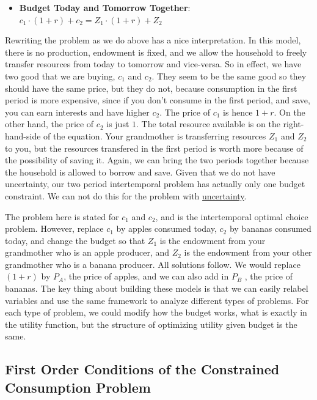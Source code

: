 \documentclass[
]{book}
\providecommand{\tightlist}{%
  \setlength{\itemsep}{0pt}\setlength{\parskip}{0pt}}
\begin{document}
\begin{itemize}
\tightlist
\item
  \textbf{Budget Today and Tomorrow Together}:
  \(c_1 \cdot (1+r)+c_2 =Z_1 \cdot (1+r)+Z_2\)
\end{itemize}

Rewriting the problem as we do above has a nice interpretation. In this
model, there is no production, endowment is fixed, and we allow the
household to freely transfer resources from today to tomorrow and
vice-versa. So in effect, we have two good that we are buying, \(c_1\) and
\(c_2\). They seem to be the same good so they should have the same price,
but they do not, because consumption in the first period is more
expensive, since if you don't consume in the first period, and save, you
can earn interests and have higher \(c_2\). The price of \(c_1\) is hence
\(1+r\). On the other hand, the price of \(c_2\) is just \(1\). The total
resource available is on the right-hand-side of the equation. Your
grandmother is transferring resources \(Z_1\) and \(Z_2\) to you, but the
resources transfered in the first period is worth more because of the
possibility of saving it. Again, we can bring the two periods together
because the household is allowed to borrow and save. Given that we do
not have uncertainty, our two period intertemporal problem has actually
only one budget constraint. We can not do this for the problem with
\href{https://math4econ.github.io/nonlinear/RiskyAsset.html}{uncertainty}.

The problem here is stated for \(c_1\) and \(c_2\), and is the intertemporal
optimal choice problem. However, replace \(c_1\) by apples consumed today,
\(c_2\) by bananas consumed today, and change the budget so that \(Z_1\) is
the endowment from your grandmother who is an apple producer, and \(Z_2\)
is the endowment from your other grandmother who is a banana producer.
All solutions follow. We would replace \((1+r)\) by \(P_A\), the price of
apples, and we can also add in \(P_B\) , the price of bananas. The key
thing about building these models is that we can easily relabel
variables and use the same framework to analyze different types of
problems. For each type of problem, we could modify how the budget
works, what is exactly in the utility function, but the structure of
optimizing utility given budget is the same.

\hypertarget{first-order-conditions-of-the-constrained-consumption-problem}{%
\subsection{First Order Conditions of the Constrained Consumption Problem}\label{first-order-conditions-of-the-constrained-consumption-problem}}
\end{document}
